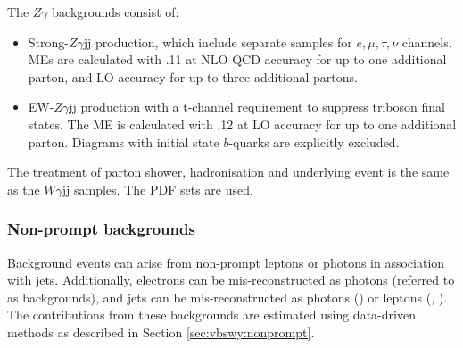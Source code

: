 The $Z\gamma$ backgrounds consist of:
\begin{itemize}
  \item Strong-$Z\gamma$jj production, which include separate samples for $e,\mu,\tau,\nu$ channels. MEs are calculated with .11 at NLO QCD accuracy for up to one additional parton, and LO accuracy for up to three additional partons.
  \item EW-$Z\gamma$jj production with a t-channel requirement to suppress triboson final states. The ME is calculated with .12 at LO accuracy for up to one additional parton. Diagrams with initial state $b$-quarks are explicitly excluded. 
\end{itemize}
The treatment of parton shower, hadronisation and underlying event is the same as the $W\gamma$jj samples. The \NNPDF PDF sets are used.
\subsubsection{Non-prompt backgrounds}
Background events can arise from non-prompt leptons or photons in association with jets. Additionally, electrons can be mis-reconstructed as photons (referred to as \efakey backgrounds), and jets can be mis-reconstructed as photons (\jfakey) or leptons (\jfakee, \jfakemu). The contributions from these backgrounds are estimated using data-driven methods as described in Section \ref{sec:vbswy:nonprompt}. %

